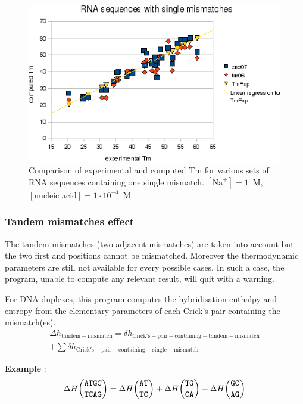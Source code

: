 \documentclass{article}
\begin{document}
\begin{figure}[h]
\includegraphics[width=1\linewidth]{images/RNASingleMismatch}
\caption{Comparison of experimental and computed Tm for various sets of
 RNA sequences containing one single mismatch. $[\mbox{Na}^+] = 1$~M, $[\mbox{nucleic acid}] = 1\cdot{}10^{-4}$~M}
\end{figure}

\clearpage
\subsubsection{Tandem mismatches effect}

The tandem mismatches (two adjacent mismatches) are taken into account but the two first and positions cannot
be mismatched. Moreover the thermodynamic parameters are still not available for every possible cases.
In such a case, the program, unable to compute any relevant result, will quit with a warning.

For DNA duplexes, this program computes the hybridisation enthalpy and entropy from the elementary 
parameters of each Crick's pair containing the mismatch(es). 
\begin{multline*}
\Delta{}h_\mathrm{tandem-mismatch} =
\delta{}h_\mathrm{Crick's-pair-containing-tandem-mismatch} \\ + 
\sum \delta{}h_\mathrm{Crick's-pair-containing-single-mismatch}
\end{multline*}


\textbf{Example} :
\begin{multline*}
\Delta H {\mbox{\texttt{ATGC}} \choose \mbox{\texttt{TCAG}}} = 
\Delta H {\mbox{\texttt{AT}} \choose \mbox{\texttt{TC}} } + 
\Delta H {\mbox{\texttt{TG}} \choose \mbox{\texttt{CA}} } + 
\Delta H {\mbox{\texttt{GC}} \choose \mbox{\texttt{AG}} } \\
\end{multline*}
\end{document}
